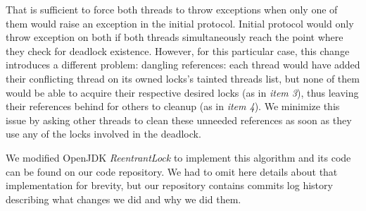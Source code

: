 That is sufficient to force both threads to throw exceptions when only one of them would raise an exception in the initial protocol. Initial protocol would only throw exception on both if both threads simultaneously reach the point where they check for deadlock existence. However, for this particular case, this change introduces a different problem: dangling references:
each thread would have added their conflicting thread on its owned locks's tainted threads list,
but none of them would be able to acquire their respective desired locks (as in \emph{item 3}),
thus leaving their references behind for others to cleanup (as in \emph{item 4}). We minimize this issue by asking other threads to clean these unneeded references as soon as they use any of the locks involved in the deadlock.

We modified OpenJDK \emph{ReentrantLock} to implement this algorithm and its code can be found on our code repository\cite{repo}. We had to omit here details about that implementation for brevity, but our repository contains commits log history describing what changes we did and why we did them.

